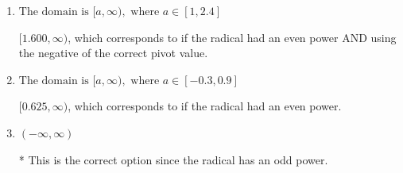 \documentclass{extbook}[14pt]
\begin{document}
\begin{enumerate}
{\begin{enumerate}[label=\Alph*.]
$(-\infty, 0.625]$, which corresponds to if the radical had an even power AND reversing the direction of the domain.
\item \( \text{The domain is } [a, \infty), \text{   where } a \in [1, 2.4] \)

$[1.600, \infty)$, which corresponds to if the radical had an even power AND using the negative of the correct pivot value.
\item \( \text{The domain is } [a, \infty), \text{   where } a \in [-0.3, 0.9] \)

$[0.625, \infty)$, which corresponds to if the radical had an even power.
\item \( (-\infty, \infty) \)

* This is the correct option since the radical has an odd power.
\end{enumerate}

}
\end{enumerate}
\end{document}
